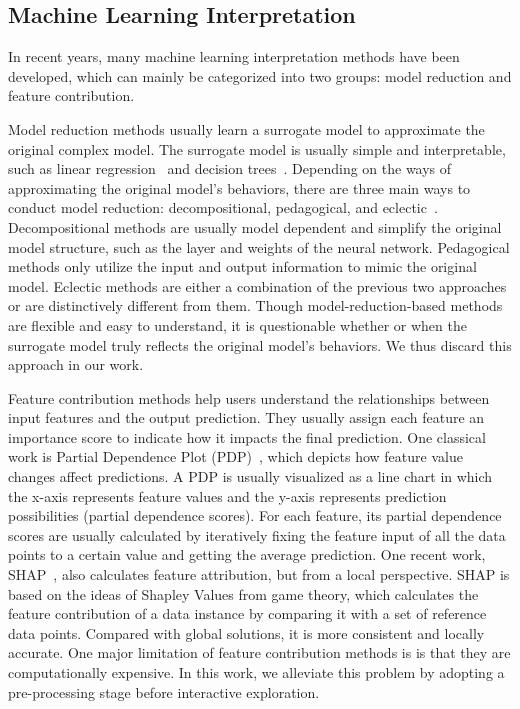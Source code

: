 \subsection{Machine Learning Interpretation}
\label{sec:mlinter}
In recent years, many machine learning interpretation methods have been developed, which can mainly be categorized into two groups: model reduction and feature contribution.

Model reduction methods usually learn a surrogate model to approximate the original complex model.
The surrogate model is usually simple and interpretable, such as linear regression~\cite{ribeiro2016should} and decision trees~\cite{craven1996extracting}. 
Depending on the ways of approximating the original model's behaviors, there are three main ways to conduct model reduction: decompositional, pedagogical, and eclectic~\cite{andrews1995survey}.
Decompositional methods are usually model dependent and simplify the original model structure, such as the layer and weights of the neural network.
Pedagogical methods only utilize the input and output information to mimic the original model.
Eclectic methods are either a combination of the previous two approaches or are distinctively different from them.
Though model-reduction-based methods are flexible and easy to understand, it is questionable whether or when the surrogate model truly reflects the original model's behaviors.
We thus discard this approach in our work.

Feature contribution methods help users understand the relationships between input features and the output prediction.
They usually assign each feature an importance score to indicate how it impacts the final prediction.
One classical work is Partial Dependence Plot (PDP)~\cite{friedman2001greedy}, which depicts how feature value changes affect predictions.
A PDP is usually visualized as a line \textbf{}chart in which the x-axis represents feature values and the y-axis represents prediction possibilities (partial dependence scores).
For each feature, its partial dependence scores are usually calculated by iteratively fixing the feature input of all the data points to a certain value and getting the average prediction.
One recent work, SHAP~\cite{lundberg2017unified}, also calculates feature attribution, but from a local perspective.
SHAP is based on the ideas of Shapley Values from game theory, which calculates the feature contribution of a data instance by comparing it with a set of reference data points.
Compared with global solutions, it is more consistent and locally accurate.
One major limitation of feature contribution methods is is that they are computationally expensive.
In this work, we alleviate this problem by adopting a pre-processing stage before interactive exploration.

